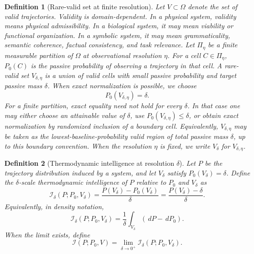 \documentclass[
  aps,
  prresearch,
  reprint,
  amsmath,
  amssymb,
  superscriptaddress,
  nofootinbib,
  longbibliography
]{revtex4-2}
\newtheorem{definition}{Definition}
\newcommand{\calI}{\mathcal{I}}
\newcommand{\dd}{\,d}
\begin{document}
\begin{definition}[Rare-valid set at finite resolution] Let \(V\subset\Omega\) denote the set of valid trajectories. Validity is domain-dependent. In a physical system, validity means physical admissibility. In a biological system, it may mean viability or functional organization. In a symbolic system, it may mean grammaticality, semantic coherence, factual consistency, and task relevance. Let \(\Pi_\eta\) be a finite measurable partition of \(\Omega\) at observational resolution \(\eta\). For a cell \(C\in\Pi_\eta\), \(P_0(C)\) is the passive probability of observing a trajectory in that cell. A rare-valid set \(V_{\delta,\eta}\) is a union of valid cells with small passive probability and target passive mass \(\delta\). When exact normalization is possible, we choose \begin{equation} P_0(V_{\delta,\eta})=\delta. \end{equation} For a finite partition, exact equality need not hold for every \(\delta\). In that case one may either choose an attainable value of \(\delta\), use \(P_0(V_{\delta,\eta})\le \delta\), or obtain exact normalization by randomized inclusion of a boundary cell. Equivalently, \(V_{\delta,\eta}\) may be taken as the lowest-baseline-probability valid region of total passive mass \(\delta\), up to this boundary convention. When the resolution \(\eta\) is fixed, we write \(V_\delta\) for \(V_{\delta,\eta}\). \end{definition}

\begin{definition}[Thermodynamic intelligence at resolution \(\delta\)]
Let \(P\) be the trajectory distribution induced by a system, and let \(V_\delta\) satisfy \(P_0(V_\delta)=\delta\). Define the \(\delta\)-scale thermodynamic intelligence of \(P\) relative to \(P_0\) and \(V_\delta\) as
\begin{equation}
    \calI_\delta(P;P_0,V_\delta)
    =
    \frac{P(V_\delta)-P_0(V_\delta)}{\delta}
    =
    \frac{P(V_\delta)-\delta}{\delta}.
    \label{eq:Idelta}
\end{equation}
Equivalently, in density notation,
\begin{equation}
    \calI_\delta(P;P_0,V_\delta)
    =
    \frac{1}{\delta}
    \int_{V_\delta}
    \left(\dd P-\dd P_0\right).
\end{equation}
When the limit exists, define
\begin{equation}
    \calI(P;P_0,V)
    =
    \lim_{\delta\to 0^+}
    \calI_\delta(P;P_0,V_\delta).
\end{equation}
\end{definition}
\end{document}
